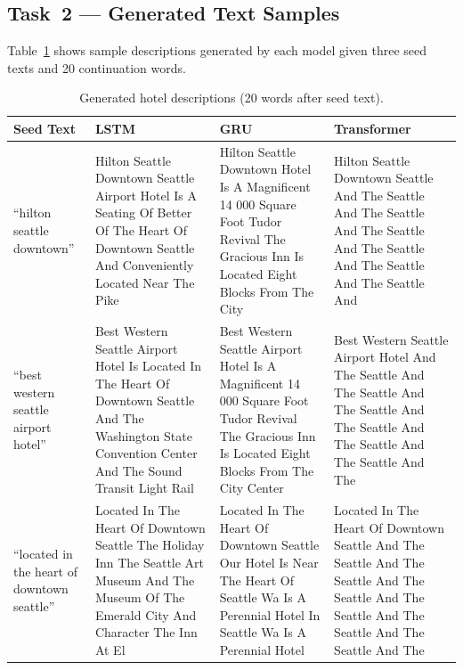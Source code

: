 \documentclass[11pt,letterpaper]{article}
\begin{document}
\subsection{Task~2 --- Generated Text Samples}

Table~\ref{tab:task2_gen} shows sample descriptions generated by each model
given three seed texts and 20 continuation words.

\begin{table}[H]
  \centering
  \caption{Generated hotel descriptions (20 words after seed text).}
  \label{tab:task2_gen}
  \small
  \begin{tabular}{p{3.2cm}p{3.8cm}p{3.8cm}p{3.8cm}}
    \toprule
    \textbf{Seed Text} & \textbf{LSTM} & \textbf{GRU} & \textbf{Transformer} \\
    \midrule
    ``hilton seattle downtown''
      & Hilton Seattle Downtown Seattle Airport Hotel Is A Seating Of Better Of The Heart Of Downtown Seattle And Conveniently Located Near The Pike
      & Hilton Seattle Downtown Hotel Is A Magnificent 14 000 Square Foot Tudor Revival The Gracious Inn Is Located Eight Blocks From The City
      & Hilton Seattle Downtown Seattle And The Seattle And The Seattle And The Seattle And The Seattle And The Seattle And The Seattle And \\[0.8em]
    ``best western seattle airport hotel''
      & Best Western Seattle Airport Hotel Is Located In The Heart Of Downtown Seattle And The Washington State Convention Center And The Sound Transit Light Rail
      & Best Western Seattle Airport Hotel Is A Magnificent 14 000 Square Foot Tudor Revival The Gracious Inn Is Located Eight Blocks From The City Center
      & Best Western Seattle Airport Hotel And The Seattle And The Seattle And The Seattle And The Seattle And The Seattle And The Seattle And The \\[0.8em]
    ``located in the heart of downtown seattle''
      & Located In The Heart Of Downtown Seattle The Holiday Inn\textregistered{} The Seattle Art Museum And The Museum Of The Emerald City And Character The Inn At El
      & Located In The Heart Of Downtown Seattle Our Hotel Is Near The Heart Of Seattle Wa Is A Perennial Hotel In Seattle Wa Is A Perennial Hotel
      & Located In The Heart Of Downtown Seattle And The Seattle And The Seattle And The Seattle And The Seattle And The Seattle And The Seattle And The \\
    \bottomrule
  \end{tabular}
\end{table}
\end{document}
